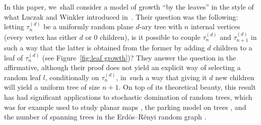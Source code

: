 \documentclass[11pt]{article}
\theoremstyle{definition}
\begin{document}
In this paper, we~shall consider a model of growth ``by the leaves'' in the style of what Luczak and Winkler introduced in~\cite{LW04}. Their question was the following: letting $\tau^{(d)}_n$ be a uniformly random plane $d$-ary tree with $n$ internal vertices (every vertex has either $d$ or $0$ children), is it possible to couple $\tau^{(d)}_n$ and $\tau^{(d)}_{n+1}$ in such a way that the latter is obtained from the former by adding $d$ children to a leaf of $\tau^{(d)}_n$ (see Figure~\ref{fig:leaf growth})? They answer the question in the affirmative, although their proof does not yield an explicit way of selecting a random leaf $l$, conditionally on $\tau^{(d)}_n$, in~such a way that giving it $d$ new children will yield a uniform tree of size $n+1$. On top of its theoretical beauty, this result has had significant applications to stochastic domination of random trees, which was for example used to study planar maps \cite{addario2014growing, CS23}, the parking model on trees \cite{goldschmidt2019parking}, and the number of spanning trees in the Erd\"os--Rényi random graph \cite{lyons2008growth}.
\end{document}
